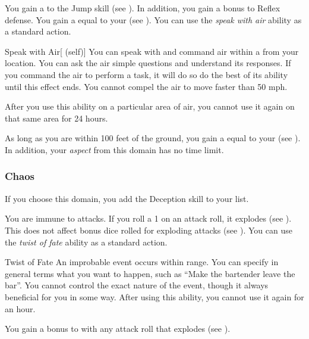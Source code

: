              You gain a   to the Jump skill (see ).
            In addition, you gain a  bonus to Reflex defense.
             You gain a  equal to your  (see ).
             You can use the \textit{speak with air} ability as a standard action.
            \begin{attuneability}{Speak with Air}[ (self)]
                You can speak with and command air within a \areahuge {} from your location.
                You can ask the air simple questions and understand its responses.
                If you command the air to perform a task, it will do so do the best of its ability until this effect ends.
                You cannot compel the air to move faster than 50 mph.

                After you use this ability on a particular area of air, you cannot use it again on that same area for 24 hours.
            \end{attuneability}
             As long as you are within 100 feet of the ground, you gain a  equal to your  (see ).
            In addition, your \textit{aspect} from this domain has no time limit.

        \subsubsection{Chaos}
            If you choose this domain, you add the Deception skill to your  list.

             You are immune to  attacks.
             If you roll a 1 on an attack roll, it explodes (see ).
            This does not affect bonus dice rolled for exploding attacks (see ).
             You can use the \textit{twist of fate} ability as a standard action.
            \begin{freeability}{Twist of Fate}
                An improbable event occurs within \rnglong range.
                You can specify in general terms what you want to happen, such as ``Make the bartender leave the bar''.
                You cannot control the exact nature of the event, though it always beneficial for you in some way.
                After using this ability, you cannot use it again for an hour.
            \end{freeability}
             You gain a  bonus to  with any attack roll that explodes (see ).

